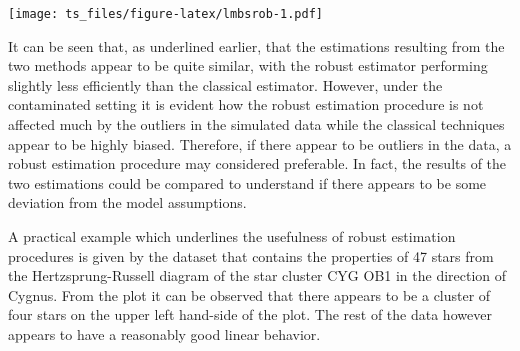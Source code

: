 \documentclass[]{book}
\theoremstyle{definition}
\theoremstyle{definition}
\theoremstyle{definition}
\theoremstyle{remark}
\let\BeginKnitrBlock\begin \let\EndKnitrBlock\end
\begin{document}
\texttt{[image: ts\_files/figure-latex/lmbsrob-1.pdf]}

It can be seen that, as underlined earlier, that the estimations
resulting from the two methods appear to be quite similar, with the
robust estimator performing slightly less efficiently than the classical
estimator. However, under the contaminated setting it is evident how the
robust estimation procedure is not affected much by the outliers in the
simulated data while the classical techniques appear to be highly
biased. Therefore, if there appear to be outliers in the data, a robust
estimation procedure may considered preferable. In fact, the results of
the two estimations could be compared to understand if there appears to
be some deviation from the model assumptions.

\BeginKnitrBlock{example}
\protect\hypertarget{exm:dsbook}{}{\label{exm:dsbook} }A practical example
which underlines the usefulness of robust estimation procedures is given
by the dataset that contains the properties of 47 stars from the
Hertzsprung-Russell diagram of the star cluster CYG OB1 in the direction
of Cygnus. From the plot it can be observed that there appears to be a
cluster of four stars on the upper left hand-side of the plot. The rest
of the data however appears to have a reasonably good linear behavior.
\EndKnitrBlock{example}
\end{document}
